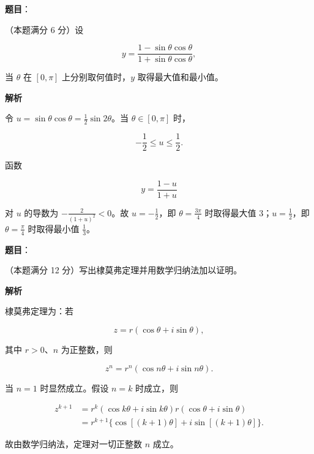 \begin{answer}

\textbf{题目}：

（本题满分 6 分）设

\nopagebreak[4]
\[
y=\frac{1-\sin\theta\cos\theta}
{1+\sin\theta\cos\theta},
\]

当 $\theta$ 在 $[0,\pi]$ 上分别取何值时，$y$ 取得最大值和最小值。

\textbf{解析}

令 $u=\sin\theta\cos\theta=\frac12\sin2\theta$。当 $\theta\in[0,\pi]$ 时，

\nopagebreak[4]
\[
-\frac12\le u\le\frac12.
\]

函数

\nopagebreak[4]
\[
y=\frac{1-u}{1+u}
\]

对 $u$ 的导数为 $-\frac2{(1+u)^2}<0$。故 $u=-\frac12$，即 $\theta=\frac{3\pi}4$ 时取得最大值 $3$；$u=\frac12$，即 $\theta=\frac\pi4$ 时取得最小值 $\frac13$。


\end{answer}
\begin{answer}

\textbf{题目}：

（本题满分 12 分）写出棣莫弗定理并用数学归纳法加以证明。

\textbf{解析}

棣莫弗定理为：若

\nopagebreak[4]
\[
z=r(\cos\theta+i\sin\theta),
\]

其中 $r>0$、$n$ 为正整数，则

\nopagebreak[4]
\[
z^n=r^n(\cos n\theta+i\sin n\theta).
\]

当 $n=1$ 时显然成立。假设 $n=k$ 时成立，则

\nopagebreak[4]
\[
\begin{aligned}
z^{k+1}
&=r^k(\cos k\theta+i\sin k\theta)
r(\cos\theta+i\sin\theta)\\
&=r^{k+1}\{\cos[(k+1)\theta]
+i\sin[(k+1)\theta]\}.
\end{aligned}
\]

故由数学归纳法，定理对一切正整数 $n$ 成立。


\end{answer}
